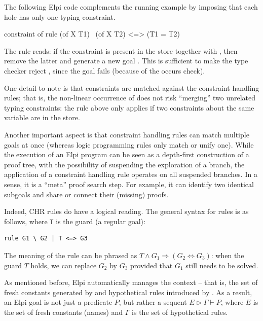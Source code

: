\documentclass[a4paper, 11pt]{book}
\begin{document}
The following Elpi code complements the running example by imposing that each
hole has only one typing constraint.

\begin{elpicode}
constraint of {
  rule (of X T1) \ (of X T2) <=> (T1 = T2)
}
\end{elpicode}


The rule reads: if the constraint  is present in the store
together with , then remove the latter and generate a new goal
. This is sufficient to make the type checker reject
, since the goal  fails (because of
the occurs check).

One detail to note is that constraints are matched against the constraint
handling rules; that is, the non-linear occurrence of  does not risk
``merging'' two unrelated typing constraints: the rule above only applies if two
constraints about the same variable are in the store.

Another important aspect is that constraint handling rules can match multiple
goals at once (whereas logic programming rules only match or unify one). While
the execution of an Elpi program can be seen as a depth-first construction of
a proof tree, with the possibility of suspending the exploration of a branch,
the application of a constraint handling rule operates on all suspended
branches. In a sense, it is a ``meta'' proof search step. For example, it can
identify two identical subgoals and share or connect their (missing) proofs.


Indeed, CHR rules do have a logical reading. The general syntax for rules is
as follows, where \texttt{T} is the guard (a regular goal):

\begin{verbatim}
rule G1 \ G2 | T <=> G3
\end{verbatim}

\noindent
The meaning of the rule can be phrased as $T \land G_1 \Rightarrow (G_2
\Leftrightarrow G_3)$: when the guard $T$ holds, we can replace $G_2$ by $G_3$
provided that $G_1$ still needs to be solved.

As mentioned before, Elpi automatically manages the context -- that is, the set
of fresh constants generated by  and hypothetical rules introduced by
\elpi{=>}. As a result, an Elpi goal is not just a predicate $P$, but rather a
sequent $E \triangleright  \Gamma \vdash P$, where $E$ is the set of fresh
constants (names) and $\Gamma$ is the set of hypothetical rules.
\end{document}
